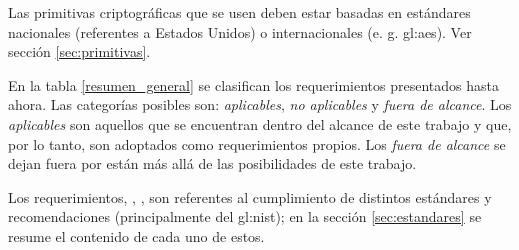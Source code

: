 {
  Las primitivas criptográficas que se usen deben estar basadas en
  estándares nacionales (referentes a Estados Unidos) o internacionales (e. g.
  \gls{gl:aes}). Ver sección \ref{sec:primitivas}.
}

En la tabla \ref{resumen_general} se clasifican los requerimientos presentados
hasta ahora. Las categorías posibles son: \textit{aplicables}, \textit{no
aplicables} y \textit{fuera de alcance}. Los \textit{aplicables} son aquellos
que  se  encuentran dentro del alcance de este trabajo y que, por lo tanto, son
adoptados como requerimientos propios. Los \textit{fuera de alcance} se dejan
fuera por están más allá de las posibilidades de este trabajo.

Los requerimientos, ,
,
 son referentes al cumplimiento
de distintos estándares y recomendaciones (principalmente del \gls{gl:nist});
en la sección \ref{sec:estandares} se resume el contenido de cada uno de
estos.

